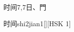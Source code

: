 \begin{entry}{时间}{7,7}{⽇、⾨}
  \begin{phonetics}{时间}{shi2jian1}[][HSK 1]
  \end{phonetics}
\end{entry}
